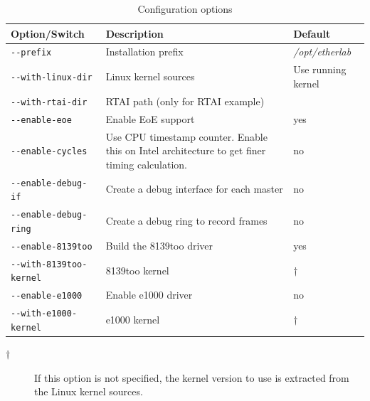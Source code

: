 \documentclass[a4paper,12pt,BCOR6mm,bibtotoc,idxtotoc]{scrbook}
\begin{document}
\begin{table}
  \caption{Configuration options}
  \label{tab:config}
  \vspace{2mm}
  \begin{tabular}{l|p{}|l}

\bf Option/Switch & \bf Description & \bf Default\\\hline

\lstinline+--prefix+ & Installation prefix & \textit{/opt/etherlab}\\

\lstinline+--with-linux-dir+ & Linux kernel sources & Use running kernel\\

\lstinline+--with-rtai-dir+ & RTAI path (only for RTAI example) & \\

\hline

\lstinline+--enable-eoe+ & Enable EoE support & yes\\

\lstinline+--enable-cycles+ & Use CPU timestamp counter. Enable this on Intel
architecture to get finer timing calculation. & no\\

\lstinline+--enable-debug-if+ & Create a debug interface for each master & no\\

\lstinline+--enable-debug-ring+ & Create a debug ring to record frames & no\\

\hline

\lstinline+--enable-8139too+ & Build the 8139too driver & yes\\

\lstinline+--with-8139too-kernel+ & 8139too kernel & $\dagger$\\

\lstinline+--enable-e1000+ & Enable e1000 driver & no\\

\lstinline+--with-e1000-kernel+ & e1000 kernel & $\dagger$\\

  \end{tabular}
  \vspace{2mm}

\begin{description}

\item[$\dagger$] If this option is not specified, the kernel version to use is
extracted from the Linux kernel sources.

\end{description}

\end{table}
\end{document}
